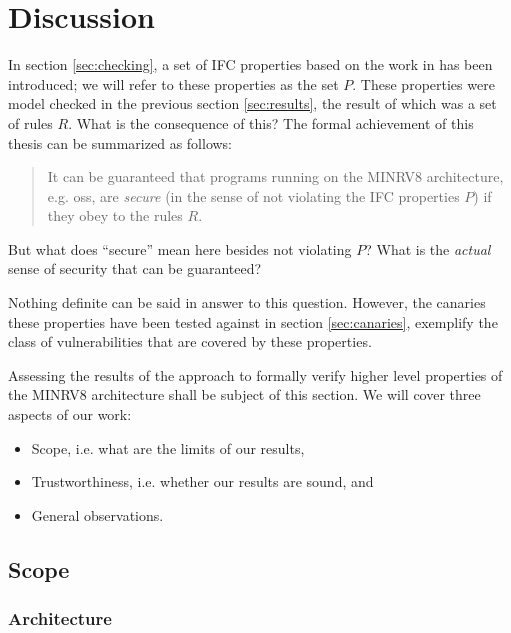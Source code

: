 
\section{Discussion}
\label{sec:discussion}

In section \ref{sec:checking}, a set of IFC properties based on the work in \cite{Ferraiuolo17} has been introduced; we will refer to these properties as the set $ P $.
These properties were model checked in the previous section \ref{sec:results}, the result of which was a set of rules $ R $.
What is the consequence of this?
The formal achievement of this thesis can be summarized as follows:
\begin{quote}
    It can be guaranteed that programs running on the MINRV8 architecture, e.g. \glspl{os}, are \textit{secure} (in the sense of not violating the IFC properties $ P $) if they obey to the rules $ R $.
\end{quote}
But what does \enquote{secure} mean here besides not violating $ P $?
What is the \textit{actual} sense of security that can be guaranteed?

Nothing definite can be said in answer to this question.
However, the canaries these properties have been tested against in section \ref{sec:canaries}, exemplify the class of vulnerabilities that are covered by these properties.

Assessing the results of the approach to formally verify higher level properties of the MINRV8 architecture shall be subject of this section.
We will cover three aspects of our work:
\begin{itemize}
    \item Scope, i.e. what are the limits of our results,
    \item Trustworthiness, i.e. whether our results are sound, and
    \item General observations.
\end{itemize}

\subsection{Scope}
\label{sec:scope}

\subsubsection{Architecture}
\label{sec:discuss-arch}

